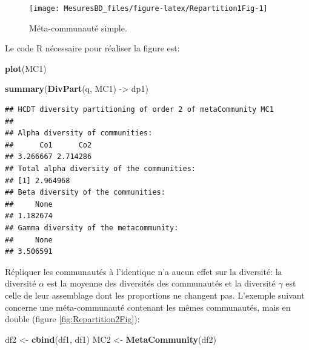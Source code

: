 \documentclass[
  11pt,
  french,
  a4paper,
  extrafontsizes,onecolumn,openright
  ]{memoir}
\newenvironment{Shaded}{\begin{snugshade}}{\end{snugshade}}
\newcommand{\KeywordTok}[1]{\textcolor[rgb]{0.13,0.29,0.53}{\textbf{#1}}}
\newcommand{\NormalTok}[1]{#1}
\newcommand{\StringTok}[1]{\textcolor[rgb]{0.31,0.60,0.02}{#1}}
\begin{document}
\normalsize

\scriptsize

\begin{figure}

{\centering \texttt{[image: MesuresBD\_files/figure-latex/Repartition1Fig-1]} 

}

\caption{Méta-communauté simple.}\label{fig:Repartition1Fig}
\end{figure}

\normalsize

Le code R nécessaire pour réaliser la figure est:

\scriptsize

\begin{Shaded}
\begin{Highlighting}[]
\KeywordTok{plot}\NormalTok{(MC1)}
\end{Highlighting}
\end{Shaded}

\normalsize

\scriptsize

\begin{Shaded}
\begin{Highlighting}[]
\KeywordTok{summary}\NormalTok{(}\KeywordTok{DivPart}\NormalTok{(q, MC1) ->}\StringTok{ }\NormalTok{dp1)}
\end{Highlighting}
\end{Shaded}

\begin{verbatim}
## HCDT diversity partitioning of order 2 of metaCommunity MC1
## 
## Alpha diversity of communities: 
##      Co1      Co2 
## 3.266667 2.714286 
## Total alpha diversity of the communities: 
## [1] 2.964968
## Beta diversity of the communities: 
##     None 
## 1.182674 
## Gamma diversity of the metacommunity: 
##     None 
## 3.506591
\end{verbatim}

\normalsize

Répliquer les communautés à l'identique n'a aucun effet sur la diversité: la diversité \(\alpha\) est la moyenne des diversités des communautés et la diversité \(\gamma\) est celle de leur assemblage dont les proportions ne changent pas.
L'exemple suivant concerne une méta-communauté contenant les mêmes communautés, mais en double (figure \ref{fig:Repartition2Fig}):

\scriptsize

\begin{Shaded}
\begin{Highlighting}[]
\NormalTok{df2 <-}\StringTok{ }\KeywordTok{cbind}\NormalTok{(df1, df1)}
\NormalTok{MC2 <-}\StringTok{ }\KeywordTok{MetaCommunity}\NormalTok{(df2)}
\end{Highlighting}
\end{Shaded}
\end{document}
